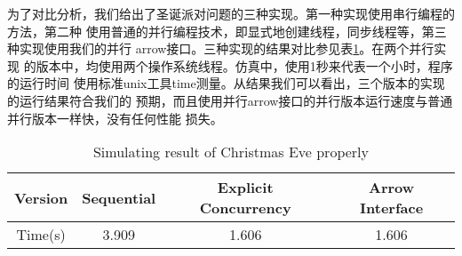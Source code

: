 \documentclass[conference]{IEEEtran}
\begin{document}
为了对比分析，我们给出了圣诞派对问题的三种实现。第一种实现使用串行编程的方法，第二种
使用普通的并行编程技术，即显式地创建线程，同步线程等，第三种实现使用我们的并行
arrow接口。三种实现的结果对比参见表\ref{tab:simulating-result}。在两个并行实现
的版本中，均使用两个操作系统线程。仿真中，使用1秒来代表一个小时，程序的运行时间
使用标准unix工具time测量。从结果我们可以看出，三个版本的实现的运行结果符合我们的
预期，而且使用并行arrow接口的并行版本运行速度与普通并行版本一样快，没有任何性能
损失。
\begin{table}
\caption{Simulating result of Christmas Eve properly}
\label{tab:simulating-result}
\centering
\begin{tabular}{|c||c||c||c|}
\hline
Version & Sequential & Explicit Concurrency & Arrow Interface\\
\hline
Time(s) & 3.909 & 1.606 & 1.606\\
\hline
\end{tabular}
\end{table}

\end{document}
